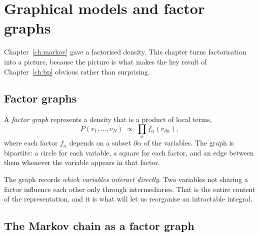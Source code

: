 \chapter{Graphical models and factor graphs}
\label{ch:graphical}

Chapter~\ref{ch:markov} gave a factorised density. This chapter turns factorisation into a
picture, because the picture is what makes the key result of Chapter~\ref{ch:bp} obvious
rather than surprising.

\section{Factor graphs}

A \emph{factor graph} represents a density that is a product of local terms,
\begin{equation}
\label{eq:factorised}
P(v_1,\dots,v_N) \;\propto\; \prod_{\alpha} f_\alpha\!\left(v_{\partial\alpha}\right),
\end{equation}
where each factor $f_\alpha$ depends on a subset $\partial\alpha$ of the variables. The graph
is bipartite: a circle for each variable, a square for each factor, and an edge between them
whenever the variable appears in that factor.

\begin{center}
\end{center}

\begin{intuition}
The graph records \emph{which variables interact directly}. Two variables not sharing a
factor influence each other only through intermediaries. That is the entire content of the
representation, and it is what will let us reorganise an intractable integral.
\end{intuition}

\section{The Markov chain as a factor graph}

